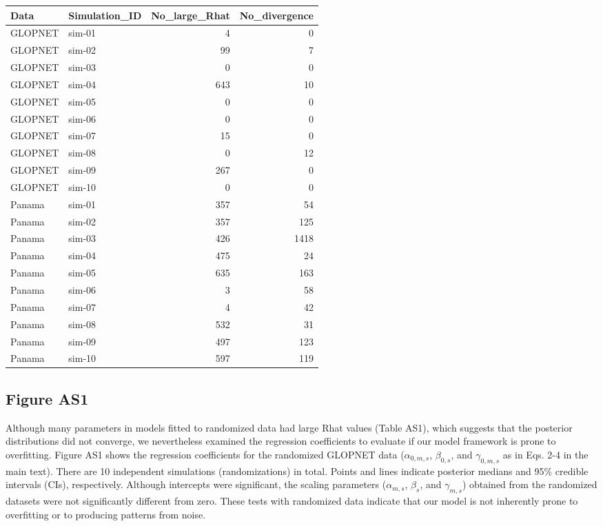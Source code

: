 \documentclass[
  12pt,
  letterpaper,
  DIV=11,
  numbers=noendperiod]{scrartcl}
\numberwithin{equation}{section}
\begin{document}
\begin{longtable*}[t]{llrr}
\toprule
Data & Simulation\_ID & No\_large\_Rhat & No\_divergence\\
\midrule
GLOPNET & sim-01 & 4 & 0\\
GLOPNET & sim-02 & 99 & 7\\
GLOPNET & sim-03 & 0 & 0\\
GLOPNET & sim-04 & 643 & 10\\
GLOPNET & sim-05 & 0 & 0\\
\addlinespace
GLOPNET & sim-06 & 0 & 0\\
GLOPNET & sim-07 & 15 & 0\\
GLOPNET & sim-08 & 0 & 12\\
GLOPNET & sim-09 & 267 & 0\\
GLOPNET & sim-10 & 0 & 0\\
\addlinespace
Panama & sim-01 & 357 & 54\\
Panama & sim-02 & 357 & 125\\
Panama & sim-03 & 426 & 1418\\
Panama & sim-04 & 475 & 24\\
Panama & sim-05 & 635 & 163\\
\addlinespace
Panama & sim-06 & 3 & 58\\
Panama & sim-07 & 4 & 42\\
Panama & sim-08 & 532 & 31\\
Panama & sim-09 & 497 & 123\\
Panama & sim-10 & 597 & 119\\
\bottomrule
\end{longtable*}

\newpage

\subsection{Figure AS1}\label{figure-as1}

Although many parameters in models fitted to randomized data had large
Rhat values (Table AS1), which suggests that the posterior distributions
did not converge, we nevertheless examined the regression coefficients
to evaluate if our model framework is prone to overfitting. Figure AS1
shows the regression coefficients for the randomized GLOPNET data
(\(\alpha_{0, m, s}\), \(\beta_{0, s}\), and \(\gamma_{0, m, s}\) as in
Eqs. 2-4 in the main text). There are 10 independent simulations
(randomizations) in total. Points and lines indicate posterior medians
and 95\% credible intervals (CIs), respectively. Although intercepts
were significant, the scaling parameters (\(\alpha_{m, s}\),
\(\beta_{s}\), and \(\gamma_{m, s}\)) obtained from the randomized
datasets were not significantly different from zero. These tests with
randomized data indicate that our model is not inherently prone to
overfitting or to producing patterns from noise.
\end{document}
